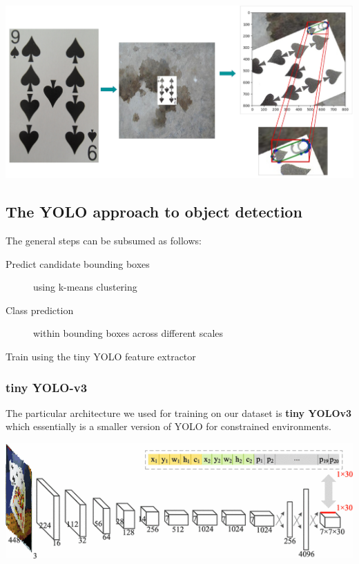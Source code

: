 \documentclass[a0,landscape]{a0poster}
\begin{document}
\begin{multicols}{3}
\vspace{1cm}
\begin{minipage}[b]{0.30\textwidth}
\includegraphics[width=\textwidth]{7-p}
\end{minipage}

\subsection*{The YOLO approach to object detection}
The general steps can be subsumed as follows:
\begin{description}
\item[Predict candidate bounding boxes] using k-means clustering
\item[Class prediction] within bounding boxes across different scales
\item[Train using the tiny YOLO feature extractor]
\end{description}
\subsubsection*{tiny YOLO-v3}

The particular architecture we used for training on our dataset is \textbf{tiny YOLOv3} which essentially is a smaller version of YOLO for constrained environments.
\begin{center}\vspace{1cm}
\includegraphics[width=0.9\linewidth]{tinyyolo}
\end{center}\vspace{1cm}

\end{multicols}
\end{document}
